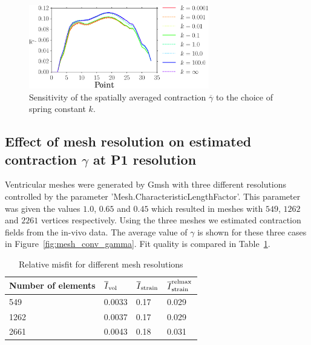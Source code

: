\begin{table}
\caption{Sensitivity of optimal $a$ value to choice of spring constant
  $k$.}
\label{tab:elast_sense}
\end{table}

\begin{figure}[t]
\includegraphics[width=0.7\textwidth]{gamma_mean}
\caption{Sensitivity of the spatially averaged 
contraction $\overline{\gamma}$ to the choice of spring constant $k$.}
\label{fig:gamma_sense}
\end{figure}


\subsection{Effect of mesh resolution on estimated contraction
  $\gamma$ at P1 resolution} 
\label{sec:mesh_res}
Ventricular meshes were generated by Gmsh
\cite{geuzaine2009gmsh} with three different resolutions controlled by the parameter
'Mesh.CharacteristicLengthFactor'.  This parameter
was given the values $1.0$, $0.65$ and $0.45$ which resulted in meshes with
$549$, $1262$ and $2261$ vertices respectively. Using the three meshes
we estimated contraction fields from the in-vivo data. The average value of
$\gamma$ is shown for these three cases in Figure~\ref{fig:mesh_conv_gamma}. 
Fit quality is compared in Table~\ref{tab:mesh_conv_opt_misfit}.

\begin{table}
\caption{Relative misfit for different mesh resolutions}
\begin{tabular}{llll}
\toprule
Number of elements & $\overline{I}_{\text{vol}}$ & $\overline{I}_{\text{strain}}$ & $\overline{I}^{\text{relmax}}_{\text{strain}}$ \\ 
\midrule
549  & 0.0033 & 0.17 & 0.029 \\
1262 & 0.0037 & 0.17 & 0.029 \\
2661 & 0.0043 & 0.18 & 0.031 \\
\bottomrule	
\end{tabular}
\label{tab:mesh_conv_opt_misfit}
\end{table}

